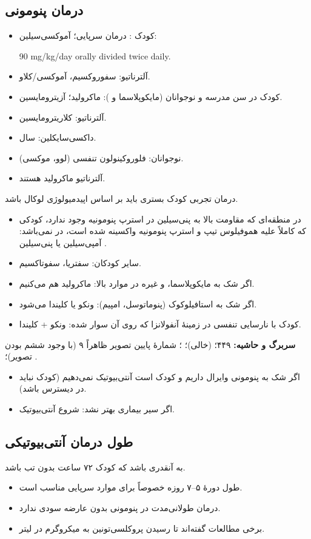 \documentclass[12pt,a4paper]{article}
\begin{document}
\subsection*{درمان پنومونی}
\begin{itemize}
\item کودک : درمان سرپایی؛ آموکسی‌سیلین:
\begin{latin}
90 mg/kg/day orally divided twice daily.
\end{latin}
\item آلترناتیو: سفوروکسیم، آموکسی/کلاو.
\item کودک در سن مدرسه و نوجوانان (مایکوپلاسما و ): ماکرولید؛ آزیترومایسین.
\item آلترناتیو: کلاریترومایسین.
\item داکسی‌سایکلین:  سال. 
\item نوجوانان: فلوروکینولون تنفسی (لوو، موکسی).
\item آلترناتیو ماکرولید هستند.
\end{itemize}
درمان تجربی کودک بستری باید بر اساس اپیدمیولوژی لوکال باشد.
\begin{itemize}
\item در منطقه‌ای که مقاومت بالا به پنی‌سیلین در استرپ پنومونیه وجود ندارد، کودکی که کاملاً علیه هموفیلوس تیپ  و استرپ پنومونیه واکسینه شده است، در  نمی‌باشد: آمپی‌سیلین یا پنی‌سیلین .
\item سایر کودکان: سفتریا، سفوتاکسیم.
\item اگر شک به مایکوپلاسما،  و غیره در موارد بالا: ماکرولید هم  می‌کنیم.
\item اگر شک به استافیلوکوک (پنوماتوسل، امپیم): ونکو یا کلیندا  می‌شود.
\item کودک با نارسایی تنفسی در زمینهٔ آنفولانزا که  روی آن سوار شده: ونکو + کلیندا.
\end{itemize}

\textbf{سربرگ و حاشیه:} ۴۴۹؛  (خالی)؛ ؛ شمارهٔ پایین تصویر ظاهراً ۹ (با وجود ششم بودن تصویر)؛ .
\begin{itemize}
\item اگر شک به پنومونی وایرال داریم و کودک  است آنتی‌بیوتیک نمی‌دهیم (کودک نباید در دیسترس باشد).
\item اگر سیر بیماری بهتر نشد: شروع آنتی‌بیوتیک.
\end{itemize}
\subsection*{طول درمان آنتی‌بیوتیکی}
به آنقدری باشد که کودک ۷۲ ساعت بدون تب باشد.
\begin{itemize}
\item طول دورهٔ ۵–۷ روزه خصوصاً برای موارد سرپایی مناسب است.
\item درمان طولانی‌مدت در پنومونی بدون عارضه سودی ندارد.
\item برخی مطالعات گفته‌اند تا رسیدن پروکلسی‌تونین به  میکروگرم در لیتر.
\end{itemize}
\end{document}
